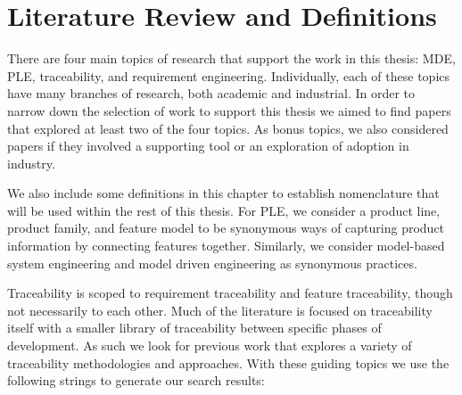 \chapter{Literature Review and Definitions}
\label{chap:lit_rev}

There are four main topics of research that support the work in this thesis: \ac{MDE}, \ac{PLE}, traceability, and requirement engineering. Individually, each of these topics have many branches of research, both academic and industrial. In order to narrow down the selection of work to support this thesis we aimed to find papers that explored at least two of the four topics. As bonus topics, we also considered papers if they involved a supporting tool or an exploration of adoption in industry. 

We also include some definitions in this chapter to establish nomenclature that will be used within the rest of this thesis. For \ac{PLE}, we consider a product line, product family, and feature model to be synonymous ways of capturing product information by connecting features together. Similarly, we consider model-based system engineering and model driven engineering as synonymous practices.

Traceability is scoped to requirement traceability and feature traceability, though not necessarily to each other. Much of the literature is focused on traceability itself with a smaller library of traceability between specific phases of development. As such we look for previous work that explores a variety of traceability methodologies and approaches. With these guiding topics we use the following strings to generate our search results:

